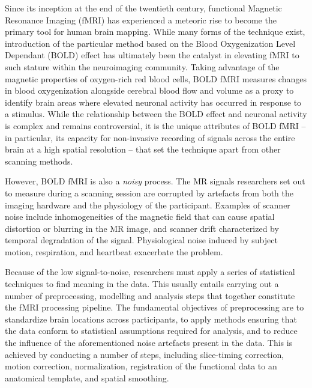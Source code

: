Since its inception at the end of the twentieth century, functional Magnetic Resonance Imaging (fMRI) has experienced a meteoric rise to become the primary tool for human brain mapping. While many forms of the technique exist, introduction of the particular method based on the Blood Oxygenization Level Dependant (BOLD) effect has ultimately been the catalyst in elevating fMRI to such stature within the neuroimaging community. Taking advantage of the magnetic properties of oxygen-rich red blood cells, BOLD fMRI measures changes in blood oxygenization alongside cerebral blood flow and volume as a proxy to identify brain areas where elevated neuronal activity has occurred in response to a stimulus. While the relationship between the BOLD effect and neuronal activity is complex and remains controversial, it is the unique attributes of BOLD fMRI -- in particular, its capacity for non-invasive recording of signals across the entire brain at a high spatial resolution -- that set the technique apart from other scanning methods.

However, BOLD fMRI is also a \textit{noisy} process. The MR signals researchers set out to measure during a scanning session are corrupted by artefacts from both the imaging hardware and the physiology of the participant. Examples of scanner noise include inhomogeneities of the magnetic field that can cause spatial distortion or blurring in the MR image, and scanner drift characterized by temporal degradation of the signal. Physiological noise induced by subject motion, respiration, and heartbeat exacerbate the problem. 

Because of the low signal-to-noise, researchers must apply a series of statistical techniques to find meaning in the data. This usually entails carrying out a number of preprocessing, modelling and analysis steps that together constitute the fMRI processing pipeline. The fundamental objectives of preprocessing are to standardize brain locations across participants, to apply methods ensuring that the data conform to statistical assumptions required for analysis, and to reduce the influence of the aforementioned noise artefacts present in the data. This is achieved by conducting a number of steps, including slice-timing correction, motion correction, normalization, registration of the functional data to an anatomical template, and spatial smoothing. 

